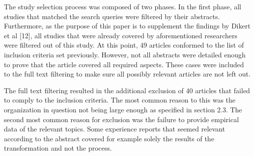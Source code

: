 The study selection process was composed of two phases. In the first
phase, all studies that matched the search queries were filtered by
their abstracts. Furthermore, as the purpose of this paper is to
supplement the findings by Dikert et al [12], all studies that were
already covered by aforementioned researchers were filtered out of
this study. At this point, 49 articles conformed to the list of inclusion
criteria set previously. However, not all abstracts were detailed enough
to prove that the article covered all required aspects. These cases were
included to the full text filtering to make sure all possibly relevant
articles are not left out.

The full text filtering resulted in the additional exclusion of 40
articles that failed to comply to the inclusion criteria. The most
common reason to this was the organization in question not being large
enough as specified in section 2.3. The second most common reason for
exclusion was the failure to provide empirical data of the relevant
topics. Some experience reports that seemed relevant according to the
abstract covered for example solely the results of the transformation
and not the process.

